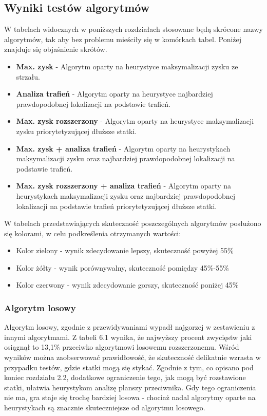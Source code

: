 \subsection{Wyniki testów algorytmów}
W tabelach widocznych w poniższych rozdziałach stosowane będą skrócone nazwy algorytmów, tak aby bez problemu mieściły się w komórkach tabel. Poniżej znajduje się objaśnienie skrótów.
\begin{itemize}
    \item \textbf{Max. zysk} - Algorytm oparty na heurystyce maksymalizacji zysku ze strzału.
    \item \textbf{Analiza trafień} - Algorytm oparty na heurystyce najbardziej prawdopodobnej lokalizacji na podstawie trafień.
    \item \textbf{Max. zysk rozszerzony} - Algorytm oparty na heurystyce maksymalizacji zysku priorytetyzującej dłuższe statki.
    \item \textbf{Max. zysk + analiza trafień} - Algorytm oparty na heurystykach maksymalizacji zysku oraz najbardziej prawdopodobnej lokalizacji na podstawie trafień.
    \item \textbf{Max. zysk rozszerzony + analiza trafień} - Algorytm oparty na heurystykach maksymalizacji zysku oraz najbardziej prawdopodobnej lokalizacji na podstawie trafień priorytetyzującej dłuższe statki. 
\end{itemize}

W tabelach przedstawiających skuteczność poszczególnych algorytmów posłużono się kolorami, w celu podkreślenia otrzymanych wartości:
\begin{itemize}
    \item Kolor zielony - wynik zdecydowanie lepszy, skuteczność powyżej 55\%
    \item Kolor żółty - wynik porównywalny, skuteczność pomiędzy 45\%-55\%
    \item Kolor czerwony - wynik zdecydowanie gorszy, skuteczność poniżej 45\%
\end{itemize}

\subsubsection{Algorytm losowy}

Algorytm losowy, zgodnie z przewidywaniami wypadł najgorzej w zestawieniu z innymi algorytmami. Z tabeli 6.1 wynika, że najwyższy procent zwycięstw jaki osiągnął to 13,1\% przeciwko algorytmowi losowemu rozszerzonemu. Wśród wyników można zaobserwować prawidłowość, że skuteczność delikatnie wzrasta w przypadku testów, gdzie statki mogą się stykać. Zgodnie z tym, co opisano pod koniec rozdziału 2.2, dodatkowe ograniczenie tego, jak mogą być rozstawione statki, ułatwia heurystykom analizę planszy przeciwnika. Gdy tego ograniczenia nie ma, gra staje się trochę bardziej losowa - chociaż nadal algorytmy oparte na heurystykach są znacznie skuteczniejsze od algorytmu losowego.

